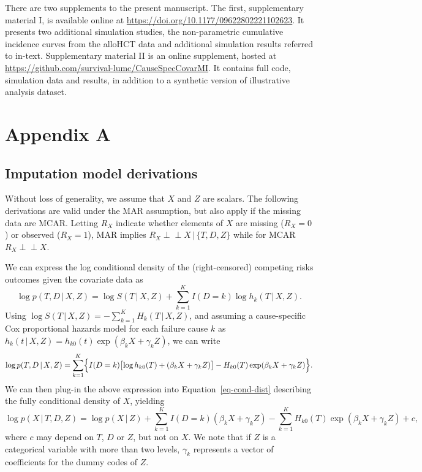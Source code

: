 \documentclass[
  letterpaper,
  DIV=11,
  numbers=noendperiod]{scrreprt}
\newcommand{\given}{\,|\,}
\newcommand{\indep}{\perp\!\!\!\!\perp}
\begin{document}

There are two supplements to the present manuscript. The first,
supplementary material I, is available online at
\url{https://doi.org/10.1177/09622802221102623}. It presents two
additional simulation studies, the non-parametric cumulative incidence
curves from the alloHCT data and additional simulation results referred
to in-text. Supplementary material II is an online supplement, hosted at
\url{https://github.com/survival-lumc/CauseSpecCovarMI}. It contains
full code, simulation data and results, in addition to a synthetic
version of illustrative analysis dataset.

\section*{Appendix A}\label{appendix-a}


\subsection*{Imputation model
derivations}\label{imputation-model-derivations}

Without loss of generality, we assume that \(X\) and \(Z\) are scalars.
The following derivations are valid under the MAR assumption, but also
apply if the missing data are MCAR. Letting \(R_X\) indicate whether
elements of \(X\) are missing (\(R_X = 0\)) or observed (\(R_X = 1\)),
MAR implies \(R_X \indep X \given \{T,D,Z\}\) while for MCAR
\(R_X \indep X\).

We can express the log conditional density of the (right-censored)
competing risks outcomes given the covariate data as \begin{equation*}
    \log p(T, D \given X, Z) =  \log S(T \given X, Z) + \sum^K_{k = 1} I(D=k) \log h_k(T \given X, Z).
\end{equation*} Using
\(\log S(T \given X, Z) = -\sum^K_{k = 1} H_k(T \given X,Z)\), and
assuming a cause-specific Cox proportional hazards model for each
failure cause \(k\) as
\(h_k(t \given X, Z) = h_{k0}(t)\exp(\beta_k X + \gamma_k Z)\), we can
write \begin{equation*}
    \log p(T, D \given X, Z) = \sum^K_{k = 1} \Bigl\{ I(D=k) \bigl[\log h_{k0}(T) + (\beta_k X + \gamma_k Z)\bigr] -  H_{k0}(T)\exp(\beta_k X + \gamma_k Z) \Bigr\}.
\end{equation*} We can then plug-in the above expression into
Equation~\ref{eq-cond-dist} describing the fully conditional density of
\(X\), yielding \begin{equation*}
    \log p(X \given T,D,Z) = \log p(X \given Z) + \sum^K_{k = 1} I(D=k) (\beta_k X + \gamma_k Z) - \sum^K_{k = 1} H_{k0}(T)\exp(\beta_k X + \gamma_k Z) + c,
\end{equation*} where \(c\) may depend on \(T\), \(D\) or \(Z\), but not
on \(X\). We note that if \(Z\) is a categorical variable with more than
two levels, \(\gamma_k\) represents a vector of coefficients for the
dummy codes of \(Z\).
\end{document}
